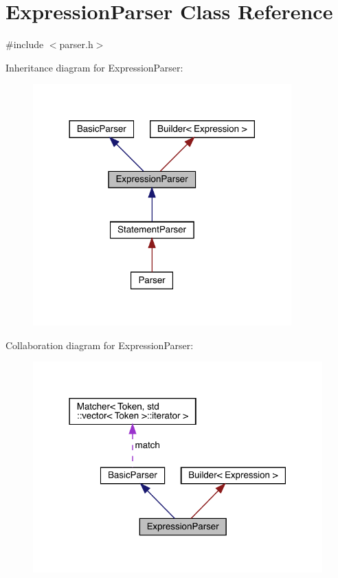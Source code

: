 \hypertarget{class_expression_parser}{}\section{Expression\+Parser Class Reference}
\label{class_expression_parser}


{\ttfamily \#include $<$parser.\+h$>$}



Inheritance diagram for Expression\+Parser\+:\nopagebreak
\begin{figure}[H]
\begin{center}
\leavevmode
\includegraphics[width=282pt]{class_expression_parser__inherit__graph}
\end{center}
\end{figure}


Collaboration diagram for Expression\+Parser\+:\nopagebreak
\begin{figure}[H]
\begin{center}
\leavevmode
\includegraphics[width=316pt]{class_expression_parser__coll__graph}
\end{center}
\end{figure}
